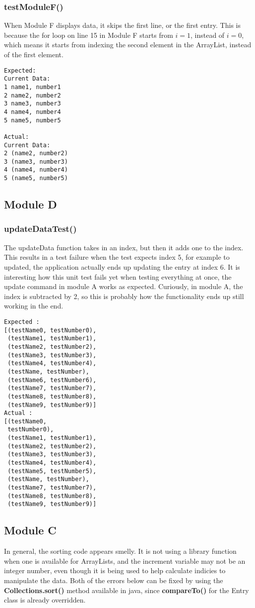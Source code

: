 \subsubsection{testModuleF()}
When Module F displays data, it skips the first line, or the first entry. This
is because the for loop on line 15 in Module F starts from $i=1$, instead of
$i=0$, which means it starts from indexing the second element in the ArrayList,
instead of the first element.

\begin{verbatim}
Expected:
Current Data:
1 name1, number1
2 name2, number2
3 name3, number3
4 name4, number4
5 name5, number5

Actual:
Current Data:
2 (name2, number2)
3 (name3, number3)
4 (name4, number4)
5 (name5, number5)
\end{verbatim}

\subsection{Module D}
\subsubsection{updateDataTest()}
The updateData function takes in an index, but then it adds one to the index.
This results in a test failure when the test expects index 5, for example to
updated, the application actually ends up updating the entry at index 6.  It is
interesting how this unit test fails yet when testing everything at once, the
update command in module A works as expected. Curiously, in module A, the index
is subtracted by 2, so this is probably how the functionality ends up still
working in the end.

\begin{verbatim}
Expected :
[(testName0, testNumber0),
 (testName1, testNumber1),
 (testName2, testNumber2),
 (testName3, testNumber3),
 (testName4, testNumber4),
 (testName, testNumber),
 (testName6, testNumber6),
 (testName7, testNumber7),
 (testName8, testNumber8),
 (testName9, testNumber9)]
Actual :
[(testName0,
 testNumber0),
 (testName1, testNumber1),
 (testName2, testNumber2),
 (testName3, testNumber3),
 (testName4, testNumber4),
 (testName5, testNumber5),
 (testName, testNumber),
 (testName7, testNumber7),
 (testName8, testNumber8),
 (testName9, testNumber9)]
\end{verbatim}


\subsection{Module C}
In general, the sorting code appears smelly. It is not using a library function
when one is available for ArrayLists, and the increment variable may not be an
integer number, even though it is being used to help calculate indicies to
manipulate the data. Both of the errors below can be fixed by using the
\textbf{Collections.sort()} method available in java, since \textbf{compareTo()}
for the Entry class is already overridden.

